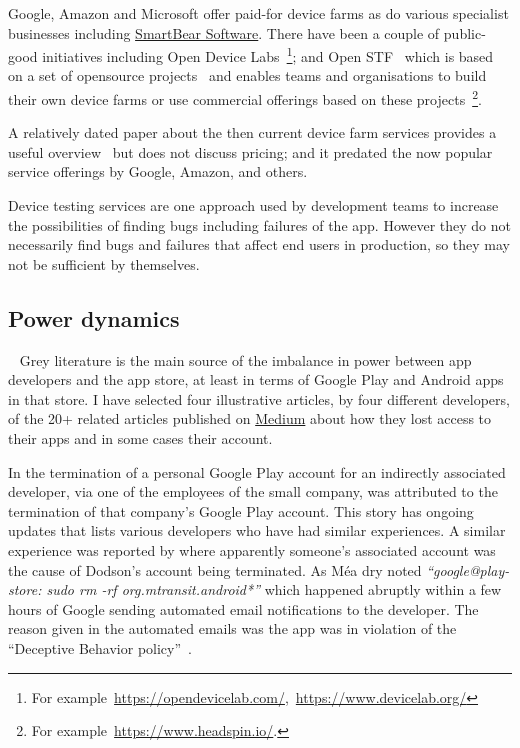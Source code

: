 Google, Amazon and Microsoft offer paid-for device farms as do various specialist businesses including \href{https://support.smartbear.com/bitbar/docs/about-bitbar.html}{SmartBear Software}. There have been a couple of public-good initiatives including Open Device Labs~\footnote{For example~\url{https://opendevicelab.com/},~\url{https://www.devicelab.org/}}; and Open STF~ which is based on a set of opensource projects~ and enables teams and organisations to build their own device farms or use commercial offerings based on these projects~\footnote{For example~\url{https://www.headspin.io/}.}.

A relatively dated paper about the then current device farm services provides a useful overview~ but does not discuss pricing; and it predated the now popular service offerings by Google, Amazon, and others. 

Device testing services are one approach used by development teams to increase the possibilities of finding bugs including failures of the app. However they do not necessarily find bugs and failures that affect end users in production, so they may not be sufficient by themselves.


\subsection{Power dynamics}~\label{rw-power-dynamics-topic}
Grey literature is the main source of the imbalance in power between app developers and the app store, at least in terms of Google Play and Android apps in that store. I have selected four illustrative articles, by four different developers, of the 20+ related articles published on \href{https://medium.com/}{Medium} %
about how they lost access to their apps and in some cases their account. 

In \textcite{martinez2019_google_just_terminated_our_startup_google_play_publisher_account_on_xmas_day} the termination of a personal Google Play account for an indirectly associated developer, via one of the employees of the small company, was attributed to the termination of that company's Google Play account. This story has ongoing updates that lists various developers who have had similar experiences. A similar experience was reported by \textcite{dodson2019_google_completely_terminated_our_new_business_etc} where apparently someone's associated account was the cause of Dodson's account being terminated. As Méa dry noted \emph{``google@play-store: sudo rm -rf org.mtransit.android*''} which happened abruptly within a few hours of Google sending automated email notifications to the developer. The reason given in the automated emails was the app was in violation of the ``Deceptive Behavior policy''~. 

